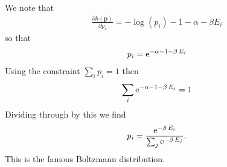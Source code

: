 \documentclass{sotonExamBoxes}    %
\newcommand{\e}[1]{{\rm e}^{#1}}
\begin{document}
\begin{question}{10}
\begin{qparts}
    \begin{answer}
      We note that
      \begin{align*}
        \frac{\partial h(\bm{p})}{\partial p_i} = -\log(p_i) -1 - \alpha
      -\beta E_i
      \end{align*}
      so that
      \begin{align*}
        p_i = \e{-\alpha -1 - \beta\,E_i}
      \end{align*}
      Using the constraint $\sum_i p_i =1$ then
      \begin{align*}
        \sum_i \e{-\alpha -1 - \beta\,E_i} =1
      \end{align*}
      Dividing through by this we find
      \begin{align*}
        p_i = \frac{\e{-\beta\,E_i}}{\sum_j \e{-\beta\,E_j}}.
      \end{align*}
      This is the famous Boltzmann distribution.
    \end{answer}
  \end{qparts}
\end{question}
\end{document}
